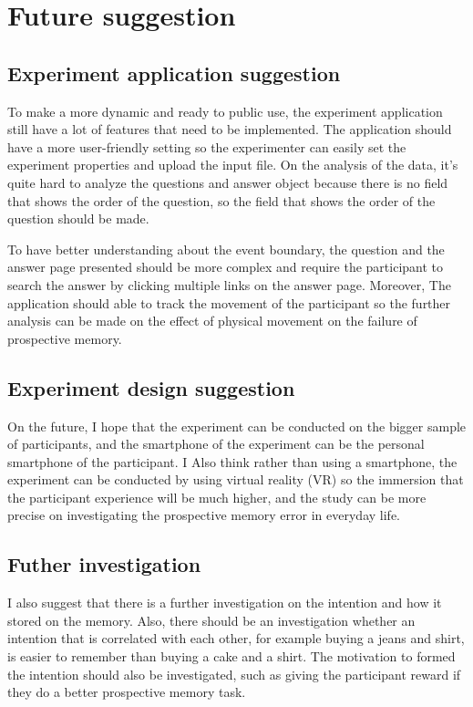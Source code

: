 \section{Future suggestion}

\subsection{Experiment application suggestion}

To make a more dynamic and ready to public use, the experiment application still have a lot of features that need to be implemented.
The application should have a more user-friendly setting so the experimenter can easily set the experiment properties and upload the input file.
On the analysis of the data, it's quite hard to analyze the questions and answer object because there is no field that shows the order of the question, so
 the field that shows the order of the question should be made.

To have better understanding about the event boundary, the question and the answer page presented should be more complex and require
the participant to search the answer by clicking multiple links on the answer page.
Moreover, The application should able to track the movement of the participant so the further analysis can be made on the effect of physical movement
on the failure of prospective memory.


\subsection{Experiment design suggestion}
On the future, I hope that the experiment can be conducted on the bigger sample of participants, and the smartphone of the experiment can be the
personal smartphone of the participant.
I Also think rather than using a smartphone, the experiment can be conducted by using virtual reality (VR) so the immersion that the participant experience
will be much higher, and the study can be more precise on investigating the prospective memory error in everyday life.

\subsection{Futher investigation}
I also suggest that there is a further investigation on the intention and how it stored on the memory. Also, there should be an investigation
whether an intention that is correlated with each other, for example buying a jeans and shirt, is easier to remember than
buying a cake and a shirt. The motivation to formed the intention should also be investigated, such as giving the participant reward if they do
a better prospective memory task.



